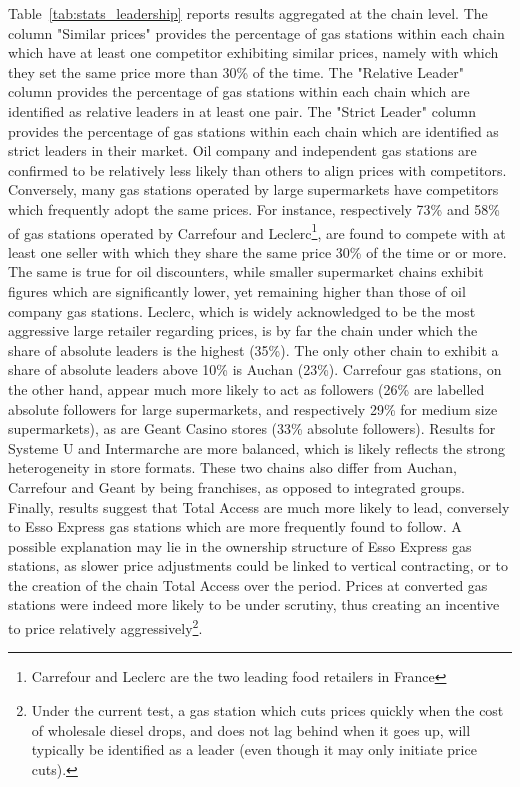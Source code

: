 \documentclass[english]{article}
\begin{document}
Table~\ref{tab:stats_leadership} reports results aggregated at the chain level. The column "Similar prices" provides the percentage of gas stations within each chain which have at least one competitor exhibiting similar prices, namely with which they set the same price more than 30\% of the time. The "Relative Leader" column provides the percentage of gas stations within each chain which are identified as relative leaders in at least one pair. The "Strict Leader" column provides the percentage of gas stations within each chain which are identified as strict leaders in their market. Oil company and independent gas stations are confirmed to be relatively less likely than others to align prices with competitors. Conversely, many gas stations operated by large supermarkets have competitors which frequently adopt the same prices. For instance, respectively 73\% and 58\% of gas stations operated by Carrefour and Leclerc\footnote{Carrefour and Leclerc are the two leading food retailers in France}, are found to compete with at least one seller with which they share the same price 30\% of the time or or more. The same is true for oil discounters, while smaller supermarket chains exhibit figures which are significantly lower, yet remaining higher than those of oil company gas stations.
Leclerc, which is widely acknowledged to be the most aggressive large retailer regarding prices, is by far the chain under which the share of absolute leaders is the highest (35\%). The only other chain to exhibit a share of absolute leaders above 10\% is Auchan (23\%). Carrefour gas stations, on the other hand, appear much more likely to act as followers (26\% are labelled absolute followers for large supermarkets, and respectively 29\% for medium size supermarkets), as are Geant Casino stores (33\% absolute followers). Results for Systeme U and Intermarche are more balanced, which is likely reflects the strong heterogeneity in store formats. These two chains also differ from Auchan, Carrefour and Geant by being franchises, as opposed to integrated groups. Finally, results suggest that Total Access are much more likely to lead, conversely to Esso Express gas stations which are more frequently found to follow. A possible explanation may lie in the ownership structure of Esso Express gas stations, as slower price adjustments could be linked to vertical contracting, or to the creation of the chain Total Access over the period. Prices at converted gas stations were indeed more likely to be under scrutiny, thus creating an incentive to price relatively aggressively\footnote{Under the current test, a gas station which cuts prices quickly when the cost of wholesale diesel drops, and does not lag behind when it goes up, will typically be identified as a leader (even though it may only initiate price cuts).}.
\end{document}
